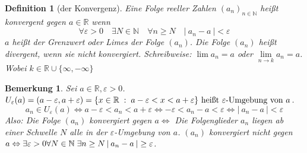 \documentclass[a4paper,titlepage,oneside]{article}
\def\N{\ensuremath{\mathbb{N}} }
\def\R{\ensuremath{\mathbb{R}} }
\renewcommand{\epsilon}{\ensuremath{\varepsilon}}
\def\sp{\hspace{0,1cm}}
\newcommand{\abs}[1]{\ensuremath{\left|\:#1\:\right|}}
\newcommand{\menge}[2]{\ensuremath{\{#1\sp : \sp #2\}}}
\theoremstyle{thmstyle}
\newtheorem{defi}[satz]{Definition}
\newtheorem{bem}[satz]{Bemerkung}
\begin{document}
\begin{defi}[der Konvergenz]
Eine Folge reeller Zahlen \((a_n)_{n\in\N}\) heißt konvergent gegen \( a\in\R\) wenn 
\[\forall \epsilon > 0 \quad \exists N \in \N \quad \forall n \ge N \quad \abs{a_n - a} < \epsilon\]
\(a\) heißt der Grenzwert oder Limes der Folge \((a_n)\). Die Folge \((a_n)\) heißt divergent, wenn sie nicht konvergiert. Schreibweise: \(\lim{a_n} = a \) oder \( \lim\limits_{n \to k}{a_n} = a \). Wobei \( k \in \R\cup\{\infty, -\infty\}\)
\end{defi}

\begin{bem}
Sei \(a \in \R, \epsilon > 0\). \(U_\epsilon(a) = (a-\epsilon, a+\epsilon) = \menge{x \in \R}{a - \epsilon < x < a + \epsilon} \text{ heißt } \epsilon\text{-Umgebung von }a\).
\[ a_n \in U_\epsilon(a) \Leftrightarrow a-\epsilon < a_n < a + \epsilon \Leftrightarrow -\epsilon < a_n - a < \epsilon \Leftrightarrow \abs{a_n - a} < \epsilon\]
Also: Die Folge \((a_n)\) konvergiert gegen \(a \Leftrightarrow \) Die Folgenglieder \(a_n\) liegen ab einer Schwelle \(N\) alle in der \(\epsilon\)-Umgebung von \(a\). \((a_n)\) konvergiert nicht gegen \(a \Leftrightarrow \exists \epsilon > 0 \forall N\in\N \sp \exists n \ge N \abs{a_n - a} \ge \epsilon\).
\end{bem}
\end{document}
